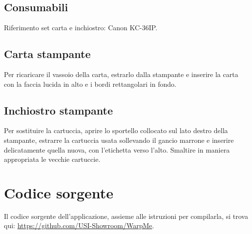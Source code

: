 \documentclass[12pt]{article}
\begin{document}
	\subsection{Consumabili}
	
		Riferimento set carta e inchiostro: Canon KC-36IP.
		

	\subsection{Carta stampante}		
		
		Per ricaricare il vassoio della carta, estrarlo dalla stampante e inserire la carta con la faccia lucida in alto e i bordi rettangolari in fondo.
		
		
	\subsection{Inchiostro stampante}
		
		Per sostituire la cartuccia, aprire lo sportello collocato sul lato destro della stampante, estrarre la cartuccia usata sollevando il gancio marrone e inserire delicatamente quella nuova, con l'etichetta verso l'alto. Smaltire in maniera appropriata le vecchie cartuccie.
		
		
		
\section{Codice sorgente}

	Il codice sorgente dell'applicazione, assieme alle istruzioni per compilarla, si trova qui: \url{https://github.com/USI-Showroom/WarpMe}.
		
	
\end{document}
